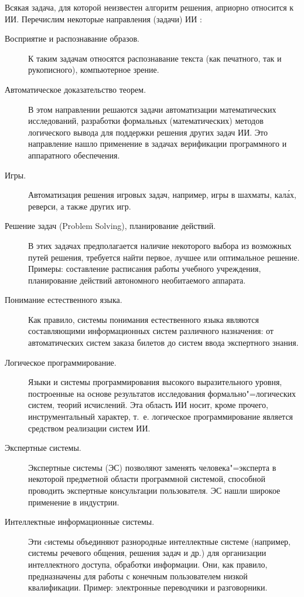 \documentclass[a4paper,14pt, openany, twoside, draft]{extbook} %
\begin{document}
Всякая задача, для которой неизвестен алгоритм решения, априорно относится к ИИ. Перечислим некоторые направления (задачи) ИИ \cite{AIDictionary}:
\begin{description}
 \item [Восприятие и распознавание образов.] К таким задачам относятся распознавание текста (как печатного, так и рукописного), компьютерное зрение.
 \item [Автоматическое доказательство теорем.] В этом направлении решаются задачи  автоматизации математических исследований, разработки формальных (математических) методов логического вывода для поддержки решения других задач ИИ. Это направление нашло применение в задачах верификации программного и аппаратного обеспечения.
 \item [Игры.] Автоматизация решения игровых задач, например, игры в шахматы, кал\'{а}х, реверси, а также других игр.
 \item [Решение задач (Problem Solving), планирование действий.] В этих задачах предполагается наличие некоторого выбора из возможных путей решения, требуется найти первое, лучшее или оптимальное решение. Примеры: составление расписания работы учебного учреждения, планирование действий автономного необитаемого аппарата.
 \item [Понимание естественного языка.] Как правило, системы понимания естественного языка являются составляющими информационных систем различного назначения: от автоматических систем заказа билетов до систем ввода экспертного знания.
 \item [Логическое программирование.] Языки и системы программирования  высокого выразительного уровня, построенные на основе результатов исследования формально"=логических систем, теорий исчислений. Эта область ИИ носит, кроме прочего, инструментальный характер, т.~е. логическое программирование является средством реализации систем ИИ.
 \item [Экспертные системы.] Экспертные системы  (ЭС) позволяют заменять человека"=эксперта в некоторой предметной области программной системой, способной проводить экспертные консультации пользователя. ЭС нашли широкое применение в индустрии.
 \item [Интеллектные информационные системы.] Эти cистемы объединяют разнородные интеллектные системе (например, системы речевого общения, решения задач и др.) для организации интеллектного доступа, обработки информации. Они, как правило, предназначены для работы с конечным пользователем низкой квалификации. Пример: электронные переводчики и разговорники.

\end{description}
\end{document}
